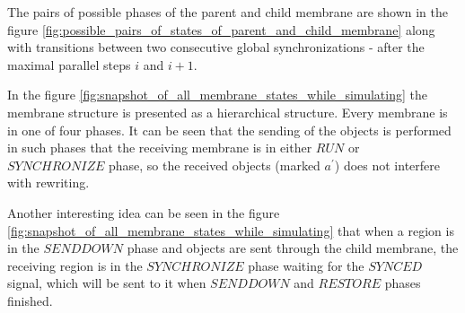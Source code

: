 \begin{dokaz}
  The pairs of possible phases of the parent and child membrane are shown in the figure \ref{fig:possible_pairs_of_states_of_parent_and_child_membrane} along with transitions between two consecutive global synchronizations - after the maximal parallel steps $i$ and $i+1$.

  In the figure \ref{fig:snapshot_of_all_membrane_states_while_simulating} the membrane structure is presented as a hierarchical structure. Every membrane is in one of four phases. It can be seen that the sending of the objects is performed in such phases that the receiving membrane is in either $\mathit{RUN}$ or $\mathit{SYNCHRONIZE}$ phase, so the received objects (marked $a^\prime$) does not interfere with rewriting.

  Another interesting idea can be seen in the figure \ref{fig:snapshot_of_all_membrane_states_while_simulating} that when a region is in the $\mathit{SENDDOWN}$ phase and objects are sent through the child membrane, the receiving region is in the $\mathit{SYNCHRONIZE}$ phase waiting for the $\mathit{SYNCED}$ signal, which will be sent to it when $\mathit{SENDDOWN}$ and $\mathit{RESTORE}$ phases finished.

\end{dokaz}
